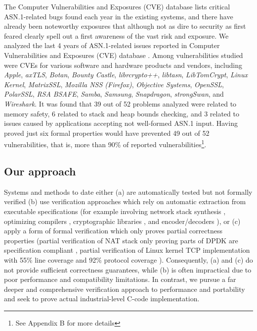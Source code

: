 \documentclass[acmsmall,nonacm]{acmart}
\begin{document}
The Computer Vulnerabilities and Exposures (CVE) database
\cite{CVE} lists critical ASN.1-related bugs found each year in
the existing systems, and there have already been noteworthy exposures
\cite{OpenSSLMemoryCorruption} that although not as dire to security as first feared
\cite{ASN1Flaw} clearly spell out a first awareness of the vast risk and
exposure. We analyzed the last 4 years of ASN.1-related issues
reported in Computer Vulnerabilities and Exposures (CVE) database
\cite{CVEaddon}. Among vulnerabilities studied were CVEs for various
software and hardware products and vendors, including \textit{Apple},
\textit{axTLS}, \textit{Botan}, \textit{Bounty Castle},
\textit{librcrypto++}, \textit{libtasn}, \textit{LibTomCrypt},
\textit{Linux Kernel}, \textit{MatrixSSL}, \textit{Mozilla NSS
  (Firefox)}, \textit{Objective Systems}, \textit{OpenSSL},
\textit{PolarSSL}, \textit{RSA BSAFE}, \textit{Samba},
\textit{Samsung}, \textit{Snapdragon}, \textit{strongSwan}, and
\textit{Wireshark}. It was found that 39 out of 52 problems analyzed
were related to memory safety, 6 related to stack and heap bounds
checking, and 3 related to issues caused by applications accepting not
well-formed ASN.1 input. Having proved just six formal properties
would have prevented 49 out of 52 vulnerabilities, that is, more than
90\% of reported vulnerabilities\footnote{See Appendix B for more details}.


\subsection{Our approach}

Systems and methods to date either (a) are automatically tested but not
formally verified (b) use verification approaches which rely on
automatic extraction from executable specifications (for example
involving network stack synthesis \cite{VNSSforSel4}, optimizing compilers
\cite{CompCert}, cryptographic libraries \cite{HACL}, and
encoder/decoders \cite{Narcissus}), or (c) apply a form of formal
verification which only proves partial correctness properties (partial
verification of NAT stack only proving parts of DPDK are specification
compliant \cite{NAT}, partial verification of Linux kernel TCP
implementation with 55\% line coverage and 92\% protocol coverage
\cite{NSDI}). Consequently, (a) and (c) do not provide sufficient
correctness guarantees, while (b) is often impractical due to poor
performance and compatibility limitations. In contrast, we pursue a
far deeper and comprehensive verification approach to performance and
portability and seek to prove actual industrial-level C-code
implementation.
\end{document}
